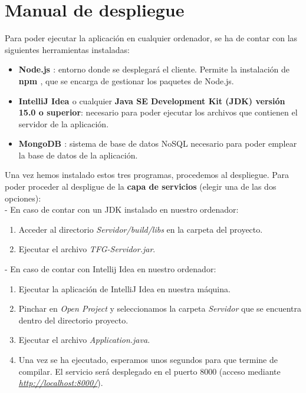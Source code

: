 \section{Manual de despliegue}

Para poder ejecutar la aplicación en cualquier ordenador, se ha de contar con las siguientes herramientas instaladas:
\begin{itemize}
\item {\bf Node.js \cite{nodejs}}: entorno donde se desplegará el cliente. Permite la instalación de {\bf npm \cite{npm}}, que se encarga de gestionar los paquetes de Node.js.
\item {\bf IntelliJ Idea \cite{intellij}} o cualquier {\bf Java SE Development Kit (JDK) \cite{jdk} versión 15.0 o superior}: necesario para poder ejecutar los archivos que contienen el servidor de la aplicación.
\item {\bf MongoDB \cite{mongodb}}: sistema de base de datos NoSQL necesario para poder emplear la base de datos de la aplicación.
\end{itemize}

Una vez hemos instalado estos tres programas, procedemos al despliegue. Para poder proceder al despligue de la {\bf capa de servicios} (elegir una de las dos opciones):
\\

- En caso de contar con un JDK instalado en nuestro ordenador:
\begin{enumerate}
\item Acceder al directorio {\it Servidor/build/libs} en la carpeta del proyecto.
\item Ejecutar el archivo {\it TFG-Servidor.jar}.
\end{enumerate}

- En caso de contar con Intellij Idea en nuestro ordenador:
\begin{enumerate}
\item Ejecutar la aplicación de IntelliJ Idea en nuestra máquina.
\item Pinchar en {\it Open Project} y seleccionamos la carpeta {\it Servidor} que se encuentra dentro del directorio proyecto.
\item Ejecutar el archivo {\it Application.java}.
\item Una vez se ha ejecutado, esperamos unos segundos para que termine de compilar. El servicio será desplegado en el puerto 8000 (acceso mediante {\it \url{http://localhost:8000/}}).
\end{enumerate}

